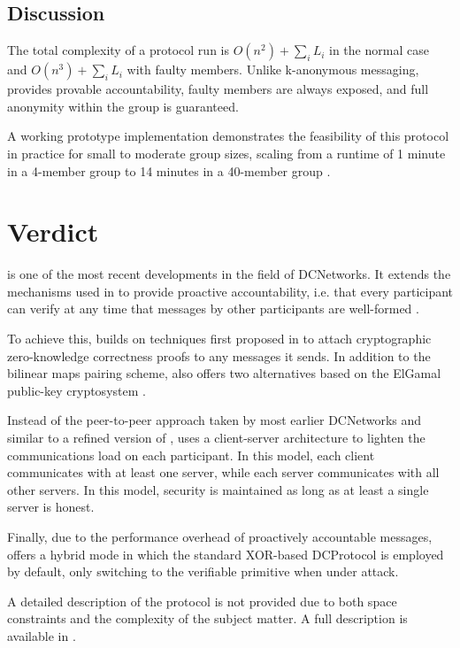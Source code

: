 \subsection{Discussion}
The total complexity of a protocol run is $O(n^2) + \sum_i L_i$ in the normal case
and $O(n^3) + \sum_i L_i$ with faulty members. Unlike k-anonymous messaging,
\Dissent provides provable accountability, faulty members are always exposed, and full anonymity
within the group is guaranteed.

A working prototype implementation demonstrates the feasibility of this protocol in practice
for small to moderate group sizes, scaling from a runtime of 1 minute in a 4-member group
to 14 minutes in a 40-member group \cite{journals/corr/abs-1004-3057}.

\section{Verdict} \label{sec:verdict}

\Verdict is one of the most recent developments in the field of \acp{DCNetwork}.
It extends the mechanisms used in \Dissent to provide proactive accountability, i.e.
that every participant can verify at any time that messages by other participants are well-formed \cite{corrigan2013proactively}.

To achieve this, \Verdict builds on techniques first proposed in \cite{juels2004dining}
to attach cryptographic zero-knowledge correctness proofs to any messages it sends.
In addition to the bilinear maps pairing scheme, \Verdict also offers two alternatives
based on the ElGamal public-key cryptosystem \cite{ElGamal1985}.

Instead of the peer-to-peer approach taken by most earlier \acp{DCNetwork}
and similar to a refined version of \Dissent \cite{wolinsky2012dissent},
\Verdict uses a client-server architecture to lighten the communications load
on each participant. In this model, each client communicates with at least one server,
while each server communicates with all other servers. In this model, security
is maintained as long as at least a single server is honest.

Finally, due to the performance overhead of proactively accountable messages,
\Verdict offers a hybrid mode in which the standard XOR-based \ac{DCProtocol}
is employed by default, only switching to the verifiable primitive when under attack.

A detailed description of the protocol is not provided due to both space constraints and
the complexity of the subject matter. A full description is available in \cite{corrigan2013proactively}.

